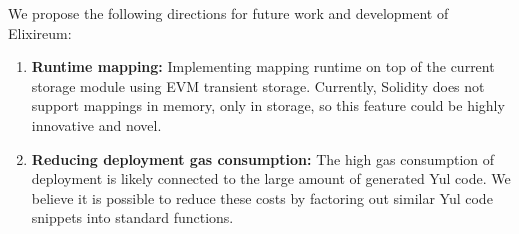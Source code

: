 We propose the following directions for future work and development of Elixireum:

\begin{enumerate}
\item \textbf{Runtime mapping:} Implementing mapping runtime on top of the current storage module using EVM transient storage. Currently, Solidity does not support mappings in memory, only in storage, so this feature could be highly innovative and novel.
\item \textbf{Reducing deployment gas consumption:} The high gas consumption of deployment is likely connected to the large amount of generated Yul code. We believe it is possible to reduce these costs by factoring out similar Yul code snippets into standard functions.
\end{enumerate}

